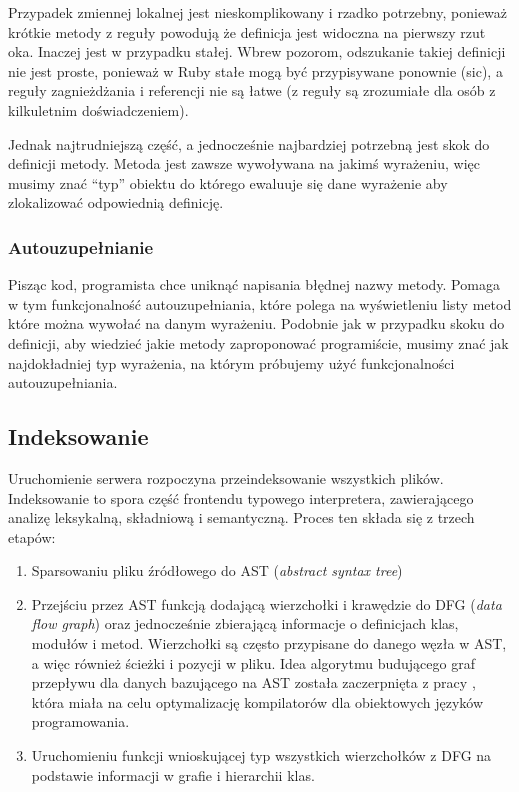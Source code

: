 \documentclass[declaration,shortabstract,mgr]{iithesis}
\begin{document}
Przypadek zmiennej lokalnej jest nieskomplikowany i rzadko potrzebny, ponieważ krótkie metody z reguły powodują że definicja jest widoczna na pierwszy rzut oka. Inaczej jest w przypadku stałej. Wbrew pozorom, odszukanie takiej definicji nie jest proste, ponieważ w Ruby stałe mogą być przypisywane ponownie (sic), a reguły zagnieżdżania i referencji nie są łatwe (z reguły są zrozumiałe dla osób z kilkuletnim doświadczeniem).

Jednak najtrudniejszą część, a jednocześnie najbardziej potrzebną jest skok do definicji metody. Metoda jest zawsze wywoływana na jakimś wyrażeniu, więc musimy znać \enquote{typ} obiektu do którego ewaluuje się dane wyrażenie aby zlokalizować odpowiednią definicję.

\subsubsection{Autouzupełnianie}

Pisząc kod, programista chce uniknąć napisania błędnej nazwy metody. Pomaga w tym funkcjonalność autouzupełniania, które polega na wyświetleniu listy metod które można wywołać na danym wyrażeniu. Podobnie jak w przypadku skoku do definicji, aby wiedzieć jakie metody zaproponować programiście, musimy znać jak najdokładniej typ wyrażenia, na którym próbujemy użyć funkcjonalności autouzupełniania.

\subsection{Indeksowanie}

Uruchomienie serwera rozpoczyna przeindeksowanie wszystkich plików. Indeksowanie to spora część frontendu typowego interpretera, zawierającego analizę leksykalną, składniową i semantyczną. Proces ten składa się z trzech etapów:
\begin{enumerate}
\item Sparsowaniu pliku źródłowego do AST (\textit{abstract syntax tree})
\item Przejściu przez AST funkcją dodającą wierzchołki i krawędzie do DFG (\textit{data flow graph}) oraz jednocześnie zbierającą informacje o definicjach klas, modułów i metod. Wierzchołki są często przypisane do danego węzła w AST, a więc również ścieżki i pozycji w pliku. Idea algorytmu budującego graf przepływu dla danych bazującego na AST została zaczerpnięta z pracy \citet*{FICA}, która miała na celu optymalizację kompilatorów dla obiektowych języków programowania.
\item Uruchomieniu funkcji wnioskującej typ wszystkich wierzchołków z DFG na podstawie informacji w grafie i hierarchii klas.
\end{enumerate}
\end{document}
